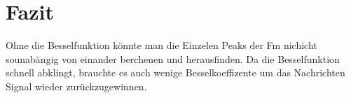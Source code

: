 %
%
%
\section{Fazit
\label{fm:section:fazit}}
Ohne die Besselfunktion könnte man die Einzelen Peaks der Fm nichicht sounabängig von einander berchenen und herausfinden.
Da die Besselfunktion schnell abklingt, brauchte es auch wenige Besselkoeffizente um das Nachrichten Signal wieder zurückzugewinnen.

